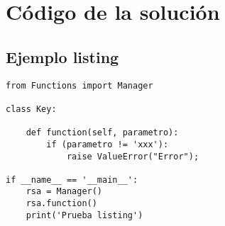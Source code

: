 \section{Código de la solución}
\lipsum[1-1]
\subsection{Ejemplo listing}
\begin{lstlisting}
from Functions import Manager

class Key:

	def function(self, parametro):
		if (parametro != 'xxx'):
			raise ValueError("Error");

if __name__ == '__main__':
	rsa = Manager()
	rsa.function()
	print('Prueba listing')
\end{lstlisting}